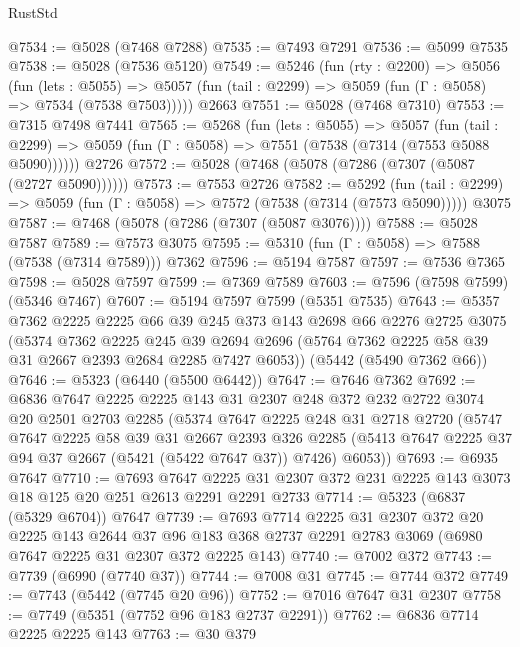 \begin{lexlean}{RustStd}
\begin{coremodule}
{\begin{coremodule}
{{{{{{{{{{{{@7534 := @5028 (@7468 @7288)
@7535 := @7493 @7291
@7536 := @5099 @7535
@7538 := @5028 (@7536 @5120)
@7549 := @5246
    (fun (rty : @2200) =>
    @5056
      (fun (lets : @5055) =>
      @5057 (fun (tail : @2299) => @5059 (fun (Γ : @5058) => @7534 (@7538 @7503)))))
    @2663
@7551 := @5028 (@7468 @7310)
@7553 := @7315 @7498 @7441
@7565 := @5268
    (fun (lets : @5055) =>
    @5057
      (fun (tail : @2299) => @5059 (fun (Γ : @5058) => @7551 (@7538 (@7314 (@7553 @5088 @5090))))))
    @2726
@7572 := @5028 (@7468 (@5078 (@7286 (@7307 (@5087 (@2727 @5090))))))
@7573 := @7553 @2726
@7582 := @5292
    (fun (tail : @2299) => @5059 (fun (Γ : @5058) => @7572 (@7538 (@7314 (@7573 @5090)))))
    @3075
@7587 := @7468 (@5078 (@7286 (@7307 (@5087 @3076))))
@7588 := @5028 @7587
@7589 := @7573 @3075
@7595 := @5310 (fun (Γ : @5058) => @7588 (@7538 (@7314 @7589))) @7362
@7596 := @5194 @7587
@7597 := @7536 @7365
@7598 := @5028 @7597
@7599 := @7369 @7589
@7603 := @7596 (@7598 @7599) (@5346 @7467)
@7607 := @5194 @7597 @7599 (@5351 @7535)
@7643 := @5357
    @7362
    @2225
    @2225
    @66
    @39
    @245
    @373
    @143
    @2698
    @66
    @2276
    @2725
    @3075
    (@5374
      @7362
      @2225
      @245
      @39
      @2694
      @2696
      (@5764 @7362 @2225 @58 @39 @31 @2667 @2393 @2684 @2285 @7427 @6053))
    (@5442 (@5490 @7362 @66))
@7646 := @5323 (@6440 (@5500 @6442))
@7647 := @7646 @7362
@7692 := @6836
    @7647
    @2225
    @2225
    @143
    @31
    @2307
    @248
    @372
    @232
    @2722
    @3074
    @20
    @2501
    @2703
    @2285
    (@5374
      @7647
      @2225
      @248
      @31
      @2718
      @2720
      (@5747
        @7647
        @2225
        @58
        @39
        @31
        @2667
        @2393
        @326
        @2285
        (@5413 @7647 @2225 @37 @94 @37 @2667 (@5421 (@5422 @7647 @37)) @7426)
        @6053))
@7693 := @6935 @7647
@7710 := @7693
    @7647
    @2225
    @31
    @2307
    @372
    @231
    @2225
    @143
    @3073
    @18
    @125
    @20
    @251
    @2613
    @2291
    @2291
    @2733
@7714 := @5323 (@6837 (@5329 @6704)) @7647
@7739 := @7693
    @7714
    @2225
    @31
    @2307
    @372
    @20
    @2225
    @143
    @2644
    @37
    @96
    @183
    @368
    @2737
    @2291
    @2783
    @3069
    (@6980 @7647 @2225 @31 @2307 @372 @2225 @143)
@7740 := @7002 @372
@7743 := @7739 (@6990 (@7740 @37))
@7744 := @7008 @31
@7745 := @7744 @372
@7749 := @7743 (@5442 (@7745 @20 @96))
@7752 := @7016 @7647 @31 @2307
@7758 := @7749 (@5351 (@7752 @96 @183 @2737 @2291))
@7762 := @6836 @7714 @2225 @2225 @143
@7763 := @30 @379
}}}}}}}}}}}}
\end{coremodule}}
\end{coremodule}
\end{lexlean}
